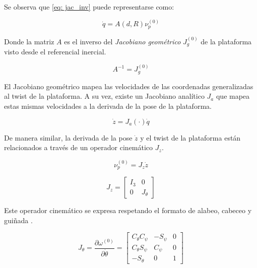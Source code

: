 Se observa que \ref{eq: jac_inv} puede 
representarse como:

\begin{equation} \label{eq: jac_g}
\dot{q} = A(d,R) \nu_p^{(0)}
\end{equation}

Donde la matriz $A$ es el inverso del 
\emph{Jacobiano geométrico} 
$J_g^{(0)}$ de la plataforma 
visto desde el referencial inercial. 

\begin{equation}
 A^{-1} = J_g^{(0)}
\end{equation}



El Jacobiano geométrico mapea las velocidades 
de las coordenadas generalizadas al twist de 
la plataforma.
A su vez, existe un Jacobiano analítico $J_a$ que mapea
estas mismas velocidades a la derivada de la pose
de la plataforma.

\begin{equation} \label{eq: jac_a}
\dot{z} = J_a(\cdot)\dot{q}
\end{equation}


De manera similar, la derivada de la pose $\dot z$
y el twist de la plataforma están relacionados 
a través de un operador cinemático $J_z$.

\begin{equation}\label{eq: kinematic operator mapping}
\nu_p^{(0)} = J_z\dot{z}
\end{equation}

\begin{equation}
 J_z = \begin{bmatrix}
        I_3 & 0\\
        0 & J_\theta
       \end{bmatrix}
\end{equation}

Este operador cinemático se expresa respetando 
el formato de alabeo, cabeceo y guiñada 
\cite{olguin20183d}.

\begin{equation}\label{eq: kinematic operator}
 J_\theta = \dfrac{\partial \omega^{(0)}}{\partial \dot \theta}= \begin{bmatrix}
        C_\theta C_\psi & -S_\psi & 0\\
        C_\theta S_\psi & C_\psi & 0\\
        -S_\theta & 0 & 1
       \end{bmatrix}
\end{equation}

